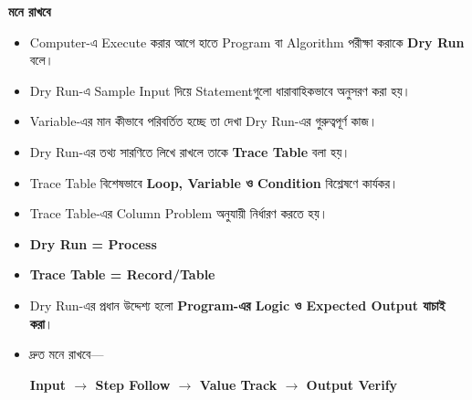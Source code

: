 \begin{rememberbox}

\textbf{\color{deepOrange}মনে রাখবে}

\begin{itemize}

\item Computer-এ Execute করার আগে হাতে Program বা Algorithm
পরীক্ষা করাকে \textbf{Dry Run} বলে।

\item Dry Run-এ Sample Input দিয়ে Statementগুলো ধারাবাহিকভাবে
অনুসরণ করা হয়।

\item Variable-এর মান কীভাবে পরিবর্তিত হচ্ছে তা দেখা
Dry Run-এর গুরুত্বপূর্ণ কাজ।

\item Dry Run-এর তথ্য সারণিতে লিখে রাখলে তাকে
\textbf{Trace Table} বলা হয়।

\item Trace Table বিশেষভাবে
\textbf{Loop, Variable ও Condition} বিশ্লেষণে কার্যকর।

\item Trace Table-এর Column Problem অনুযায়ী নির্ধারণ করতে হয়।

\item \textbf{Dry Run = Process}

\item \textbf{Trace Table = Record/Table}

\item Dry Run-এর প্রধান উদ্দেশ্য হলো
\textbf{Program-এর Logic ও Expected Output যাচাই করা}।

\item দ্রুত মনে রাখবে—

\begin{center}

\textbf{
Input
\(\rightarrow\)
Step Follow
\(\rightarrow\)
Value Track
\(\rightarrow\)
Output Verify
}

\end{center}

\end{itemize}

\end{rememberbox}

\small

